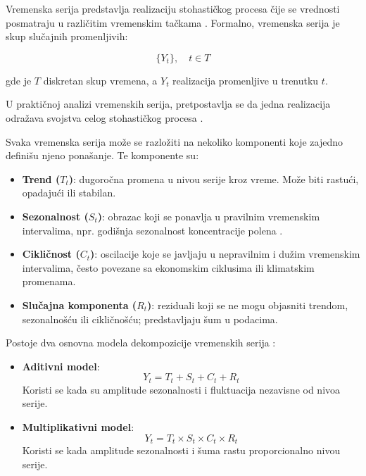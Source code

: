 \documentclass[12pt]{article}
\begin{document}
Vremenska serija predstavlja realizaciju stohastičkog procesa čije se vrednosti posmatraju u različitim vremenskim tačkama \cite{yule1927, box1970}. Formalno, vremenska serija je skup slučajnih promenljivih:

\[
\{Y_t\}, \quad t \in T
\]

gde je $T$ diskretan skup vremena, a $Y_t$ realizacija promenljive u trenutku $t$.

U praktičnoj analizi vremenskih serija, pretpostavlja se da jedna realizacija odražava svojstva celog stohastičkog procesa \cite{slutsky1937}.

Svaka vremenska serija može se razložiti na nekoliko komponenti koje zajedno definišu njeno ponašanje. Te komponente su:

\begin{itemize}
    \item \textbf{Trend ($T_t$)}: dugoročna promena u nivou serije kroz vreme. Može biti rastući, opadajući ili stabilan.
    
    \item \textbf{Sezonalnost ($S_t$)}: obrazac koji se ponavlja u pravilnim vremenskim intervalima, npr. godišnja sezonalnost koncentracije polena \cite{sofia2023}.
    
    \item \textbf{Cikličnost ($C_t$)}: oscilacije koje se javljaju u nepravilnim i dužim vremenskim intervalima, često povezane sa ekonomskim ciklusima ili klimatskim promenama.
    
    \item \textbf{Slučajna komponenta ($R_t$)}: reziduali koji se ne mogu objasniti trendom, sezonalnošću ili cikličnošću; predstavljaju šum u podacima.
\end{itemize}

Postoje dva osnovna modela dekompozicije vremenskih serija \cite{yule1927, box1970}:

\begin{itemize}
    \item \textbf{Aditivni model}:
    \begin{equation*}
        Y_t = T_t + S_t + C_t + R_t
    \end{equation*}
    Koristi se kada su amplitude sezonalnosti i fluktuacija nezavisne od nivoa serije.
    
    \item \textbf{Multiplikativni model}:
    \begin{equation*}
        Y_t = T_t \times S_t \times C_t \times R_t
    \end{equation*}
    Koristi se kada amplitude sezonalnosti i šuma rastu proporcionalno nivou serije.
\end{itemize}
\end{document}

